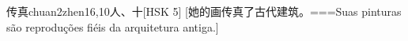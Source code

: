 \begin{EntryWithPhonetic}{传真}{chuan2zhen1}{6,10}{⼈、⼗}[HSK 5]
  [她的画传真了古代建筑。===Suas pinturas são reproduções fiéis da arquitetura antiga.]
\end{EntryWithPhonetic}

